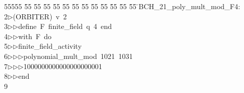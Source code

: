 %
%
\begin{tabbing}
55555 \= 55 \= 55 \= 55 \= 55 \= 55 \= 55 \= 55 \= 55 \= 55 \= 55 \= 55 \= 55 \= \>BCH\_21\_poly\_mult\_mod\_F4:\\[0pt]
2\>$\triangleright$\>(ORBITER)\ v\ 2\ \\[0pt]
3\>$\triangleright$\>$\triangleright$\>define\ F\ finite\_field\ q\ 4\ end\ \\[0pt]
4\>$\triangleright$\>$\triangleright$\>with\ F\ do\ \\[0pt]
5\>$\triangleright$\>$\triangleright$\>finite\_field\_activity\ \\[0pt]
6\>$\triangleright$\>$\triangleright$\>$\triangleright$\>polynomial\_mult\_mod\ 1021\ 1031\ \\[0pt]
7\>$\triangleright$\>$\triangleright$\>$\triangleright$\>1000000000000000000001\ \\[0pt]
8\>$\triangleright$\>$\triangleright$\>end\\[0pt]
9\>\end{tabbing}
